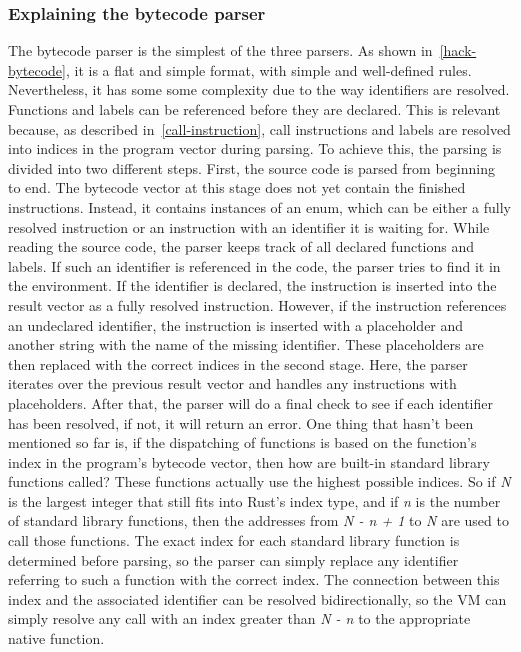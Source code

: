 \subsubsection{Explaining the bytecode parser}
The bytecode parser is the simplest of the three parsers. As shown in~\cref{hack-bytecode}, it is a flat and simple format, with simple and well-defined rules. Nevertheless, it has some some complexity due to the way identifiers are resolved. Functions and labels can be referenced before they are declared. This is relevant because, as described in~\cref{call-instruction}, call instructions and labels are resolved into indices in the program vector during parsing.
To achieve this, the parsing is divided into two different steps.
First, the source code is parsed from beginning to end. The bytecode vector at this stage does not yet contain the finished instructions.
Instead, it contains instances of an enum, which can be either a fully resolved instruction or an instruction with an identifier it is waiting for. While reading the source code, the parser keeps track of all declared functions and labels.
If such an identifier is referenced in the code, the parser tries to find it in the environment. If the identifier is declared, the instruction is inserted into the result vector as a fully resolved instruction. However, if the instruction references an undeclared identifier, the instruction is inserted with a placeholder and another string with the name of the missing identifier.
These placeholders are then replaced with the correct indices in the second stage. Here, the parser iterates over the previous result vector and handles any instructions with placeholders.
After that, the parser will do a final check to see if each identifier has been resolved, if not, it will return an error.
One thing that hasn't been mentioned so far is, if the dispatching of functions is based on the function's index in the program's bytecode vector, then how are built-in standard library functions called?
These functions actually use the highest possible indices. So if \emph{N} is the largest integer that still fits into Rust's index type, and if \emph{n} is the number of standard library functions, then the addresses from \emph{N - n + 1} to \emph{N} are used to call those functions.
The exact index for each standard library function is determined before parsing, so the parser can simply replace any identifier referring to such a function with the correct index.
The connection between this index and the associated identifier can be resolved bidirectionally, so the VM can simply resolve any call with an index greater than \emph{N - n} to the appropriate native function.

